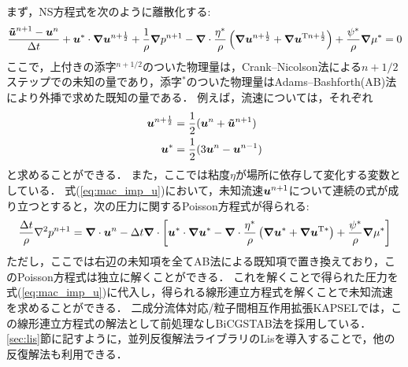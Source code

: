 \documentclass[pdflatex,a4paper,10pt,ja=standard]{bxjsarticle}
\def\vec#1{\mbox{\boldmath $#1$}}
\begin{document}
まず，NS方程式を次のように離散化する:
\begin{align}
    \frac{\vec{\tilde{u}}^{n+1} - \vec{u}^{n}}{\Delta t} + \vec{u}^{*} \cdot \vec{\nabla} \vec{u}^{n+\frac{1}{2}} + \frac{1}{\rho}\vec{\nabla} p^{n+1} - \vec{\nabla} \cdot \frac{\eta^{*}}{\rho} \left( \vec{\nabla} \vec{u}^{n+\frac{1}{2}} + \vec{\nabla} \vec{u}^{\mathrm{T} n+\frac{1}{2}} \right) + \frac{\psi^{*}}{\rho}\vec{\nabla}\mu^{*} = 0
    \label{eq:mac_imp_u}
\end{align}
ここで，上付きの添字${}^{n + 1/2}$のついた物理量は，Crank--Nicolson法による$n + 1/2$ステップでの未知の量であり，添字${}^{*}$のついた物理量はAdams--Bashforth(AB)法により外挿で求めた既知の量である．
例えば，流速については，それぞれ
\begin{align}
    \vec{u}^{n+\frac{1}{2}} &= \frac{1}{2}(\vec{u}^{n} + \vec{\tilde{u}}^{n+1})\\
    \vec{u}^{*} &= \frac{1}{2}(3\vec{u}^{n} - \vec{u}^{n-1})
\end{align}
と求めることができる．
また，ここでは粘度$\eta$が場所に依存して変化する変数としている．
式(\ref{eq:mac_imp_u})において，未知流速$\vec{u}^{n+1}$について連続の式が成り立つとすると，次の圧力に関するPoisson方程式が得られる:
\begin{align}
    \frac{\Delta t}{\rho} \nabla^2 p^{n+1} = \vec{\nabla} \cdot \vec{u}^{n} - \Delta t \vec{\nabla} \cdot \left[ \vec{u}^{*} \cdot \vec{\nabla} \vec{u}^{*} - \vec{\nabla} \cdot \frac{\eta^{*}}{\rho} \left( \vec{\nabla} \vec{u}^{*} + \vec{\nabla} \vec{u}^{\mathrm{T} *} \right) + \frac{\psi^{*}}{\rho}\vec{\nabla}\mu^{*} \right]
\end{align}
ただし，ここでは右辺の未知項を全てAB法による既知項で置き換えており，このPoisson方程式は独立に解くことができる．
これを解くことで得られた圧力を式(\ref{eq:mac_imp_u})に代入し，得られる線形連立方程式を解くことで未知流速を求めることができる．
二成分流体対応/粒子間相互作用拡張KAPSELでは，この線形連立方程式の解法として前処理なしBiCGSTAB法を採用している．
\ref{sec:lis}節に記すように，並列反復解法ライブラリのLisを導入することで，他の反復解法も利用できる．
\end{document}
